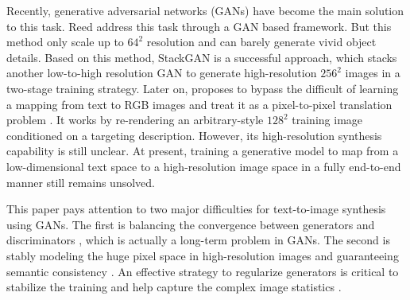 \documentclass[10pt,twocolumn,letterpaper]{article}
\begin{document}
Recently, generative adversarial networks (GANs) have become the main solution to this task. 
Reed \etal \cite{reed2016generative} address this task through a GAN based framework. But this method only scale up to $64^2$ resolution and can barely generate vivid object details.
Based on this method, StackGAN  \cite{han2017stackgan} is a successful approach, which stacks another low-to-high resolution GAN to generate high-resolution $256^2$ images in a two-stage training strategy. Later on, \cite{dong2017semantic} proposes to bypass the difficult of learning a mapping from text to RGB images and treat it as a pixel-to-pixel translation problem \cite{isola2016image}. It works by re-rendering an arbitrary-style $128^2$ training  image conditioned on a targeting description. However, its high-resolution synthesis capability is still unclear. 
At present, training a generative model to map from a low-dimensional text space to a high-resolution image space in a fully end-to-end manner still remains unsolved. 


This paper pays attention to two major difficulties for text-to-image synthesis using GANs. The first is balancing the convergence between generators and discriminators \cite{goodfellow2014generative,improvedGAN}, which is actually a long-term problem in GANs. The second is stably modeling the huge pixel space in high-resolution images and guaranteeing semantic consistency \cite{han2017stackgan}. 
An effective strategy to regularize generators is critical to stabilize the training and help capture the complex image statistics \cite{huang2016stacked}. 
\end{document}
